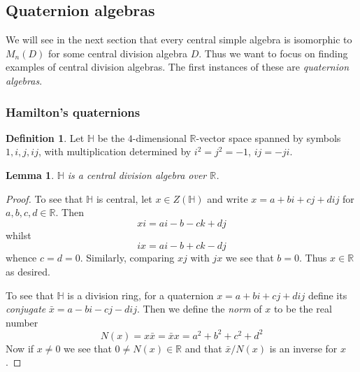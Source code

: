 \documentclass[11pt]{amsart}
\numberwithin{equation}{section}
\newtheorem{lemma}[equation]{Lemma}
\theoremstyle{remark}
\theoremstyle{remark}
\theoremstyle{remark}
\theoremstyle{definition}
\theoremstyle{definition}
\theoremstyle{definition}
\newtheorem{defi}[equation]{Definition}
\theoremstyle{definition}
\theoremstyle{definition}
\theoremstyle{definition}
\begin{document}
%

\subsection{Quaternion algebras}

We will see in the next section that every central simple algebra is isomorphic to $M_n(D)$ for some central division algebra $D$. Thus we want to focus on finding examples of central division algebras. The first instances of these are \textit{quaternion algebras}. 

\subsubsection{Hamilton's quaternions}

\begin{defi}
Let $\mathbb{H}$ be the $4$-dimensional $\mathbb{R}$-vector space spanned by symbols $1,i,j,ij$, with multiplication determined by $i^2=j^2=-1$, $ij=-ji$. 
\end{defi}

\begin{lemma}
$\mathbb{H}$ is a central division algebra over $\mathbb{R}$.
\end{lemma}

\begin{proof}
To see that $\mathbb{H}$ is central, let $x\in Z(\mathbb{H})$ and write $x=a+bi+cj+dij$ for $a,b,c,d\in \mathbb{R}$. Then
\[xi=ai-b-ck+dj\]
whilst
\[ix=ai-b+ck-dj\]
whence $c=d=0$. Similarly, comparing $xj$ with $jx$ we see that $b=0$. Thus $x\in \mathbb{R}$ as desired.

To see that $\mathbb{H}$ is a division ring, for a quaternion $x=a+bi+cj+dij$ define its \textit{conjugate} $\bar{x}=a-bi-cj-dij$. Then we define the \textit{norm} of $x$ to be the real number
\[N(x)=x\bar{x}=\bar{x}x=a^2+b^2+c^2+d^2\]
Now if $x\neq 0$ we see that $0\neq N(x)\in \mathbb{R}$ and that $\bar{x}/N(x)$ is an inverse for $x$.
\end{proof}
\end{document}
